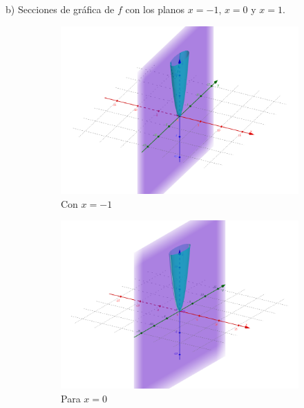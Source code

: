 \documentclass[letterpaper,11pt]{article}
\begin{document}
\begin{enumerate}
b) Secciones de gráfica de $f$ con los planos $x = -1$, $x = 0$ y $x = 1$.\\
\begin{figure}[h!]
	\centering
	\begin{subfigure}{0.3\textwidth}
		\includegraphics[width=\linewidth]{img/1b1}
		\caption{Con $ x = -1 $}
	\end{subfigure}
	\begin{subfigure}{0.3\textwidth}
		\includegraphics[width=\linewidth]{img/1b2}
		\caption{Para $ x = 0 $}
	\end{subfigure}
	\begin{subfigure}{0.3\textwidth}

\end{subfigure}
\end{figure}
\end{enumerate}
\end{document}
